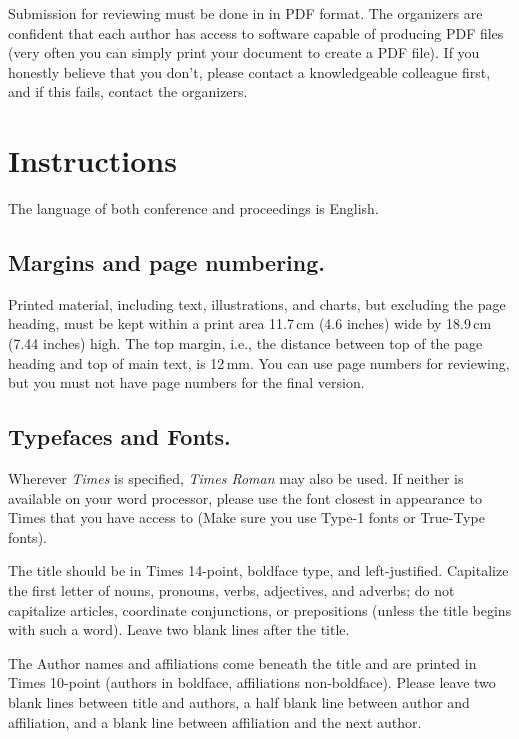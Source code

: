 \documentclass[twoside]{article}
\begin{document}
Submission for reviewing must be done in in PDF format. The organizers are 
confident that each author has access to software capable of producing PDF 
files (very often you can simply print your document to create a PDF 
file). If you honestly believe that you don't, please contact a 
knowledgeable colleague first, and if this fails, contact the organizers.

\section{Instructions}

The language of both conference and proceedings is English.

\subsection{Margins and page numbering.}

Printed material, including text, illustrations, and charts, but excluding 
the page heading, must be kept within a print area 11.7\,cm (4.6 inches) 
wide by 18.9\,cm (7.44 inches) high. The top margin, i.e., the distance 
between top of the page heading and top of main text, is 12\,mm. You can 
use page numbers for reviewing, but you must not have page numbers for the 
final version.

\subsection{Typefaces and Fonts.}

Wherever {\em Times} is specified, {\em Times Roman} may also be used. If 
neither is available on your word processor, please use the font closest 
in appearance to Times that you have access to (Make sure you use Type-1 
fonts or True-Type fonts).

The title should be in Times 14-point, boldface type, and left-justified. 
Capitalize the first letter of nouns, pronouns, verbs, adjectives, and 
adverbs; do not capitalize articles, coordinate conjunctions, or 
prepositions (unless the title begins with such a word). Leave two blank 
lines after the title.

The Author names and affiliations come beneath the title and are printed 
in Times 10-point (authors in boldface, affiliations non-boldface). Please 
leave two blank lines between title and authors, a half blank line between 
author and affiliation, and a blank line between affiliation and the next 
author.
\end{document}
